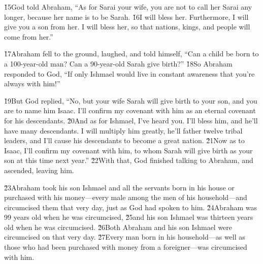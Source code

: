 \v{15}God told Abraham, ``As for Sarai your wife, you are not to call her Sarai any longer, because her name is to be Sarah. \v{16}I will bless her. Furthermore, I will give you a son from her. I will bless her, so that nations, kings, and people will come from her.''

\v{17}Abraham fell to the ground, laughed, and told himself, ``Can a child be born to a 100-year-old man? Can a 90-year-old Sarah give birth?'' \v{18}So Abraham responded to God, ``If only Ishmael would live in constant awareness that you're always with him!''

\v{19}But God replied, ``No, but your wife Sarah will give birth to your son, and you are to name him Isaac. I'll confirm my covenant with him as an eternal covenant for his descendants. \v{20}And as for Ishmael, I've heard you. I'll bless him, and he'll have many descendants. I will multiply him greatly, he'll father twelve tribal leaders, and I'll cause his descendants to become a great nation. \v{21}Now as to Isaac, I'll confirm my covenant with him, to whom Sarah will give birth as your son at this time next year.'' \v{22}With that, God finished talking to Abraham, and ascended, leaving him.

\v{23}Abraham took his son Ishmael and all the servants born in his house or purchased with his money---every male among the men of his household---and circumcised them that very day, just as God had spoken to him. \v{24}Abraham was 99 years old when he was circumcised, \v{25}and his son Ishmael was thirteen years old when he was circumcised. \v{26}Both Abraham and his son Ishmael were circumcised on that very day. \v{27}Every man born in his household---as well as those who had been purchased with money from a foreigner---was circumcised with him.

